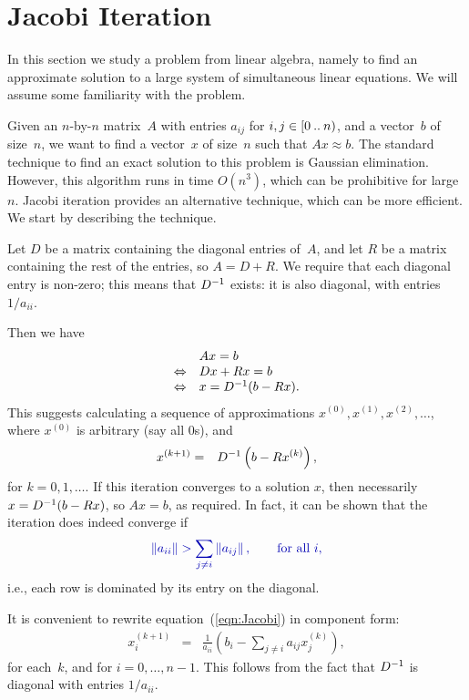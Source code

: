 \section{Jacobi Iteration}

In this section we study a problem from linear algebra, namely to find an
approximate solution to a large system of simultaneous linear equations.  We
will assume some familiarity with the problem. 

Given an $n$-by-$n$ matrix~$A$ with entries $a_{ij}$ for $i,j \in
[0 \mathbin{..} n)$, and a vector~$b$ of size~$n$, we want to find a vector~$x$
of size~$n$ such that $Ax \approx b$.
%
The standard technique to find an exact solution to this problem is Gaussian
elimination.  However, this algorithm runs in time $O(n^3)$, which can be
prohibitive for large~$n$.  Jacobi iteration provides an alternative
technique, which can be more efficient.  We start by describing the
technique.

Let $D$ be a matrix containing the diagonal entries of~$A$, and let $R$ be a
matrix containing the rest of the entries, so $A = D+R$.  We require that each
diagonal entry is non-zero; this means that $D^{-1}$ exists: it is also
diagonal, with entries $1/a_{ii}$.

Then we have
\[
\begin{array}{cl}
& Ax = b \\
\Leftrightarrow & Dx + Rx = b \\
\Leftrightarrow & x = D^{-1} (b - Rx).
\end{array}
\]
This suggests calculating a sequence of approximations $x^{(0)}, x^{(1)},
x^{(2)}, \ldots$, where $x^{(0)}$ is arbitrary (say all $0$s), and
\begin{eqnarray}
x^{(k+1)} & = & D^{-1} \left( b-R x^{(k)} \right), \label{eqn:Jacobi}
\end{eqnarray}
for $k = 0,1,\ldots$.  If this iteration converges to a solution $x$, then
necessarily $x = D^{-1} (b - Rx)$, so $Ax = b$, as required.  In fact, it
can be shown that the iteration does indeed converge if
\[\mstyle
 \left \| a_{ii} \right \| > \sum_{j \ne i} \left \| a_{ij} \right \| ,
  \qquad \mbox{for all $i$}, 
\]
i.e., each row is dominated by its entry on the diagonal. 

It is convenient to rewrite equation~(\ref{eqn:Jacobi}) in component form:
\begin{eqnarray}
x^{(k+1)}_i & = & \frac{1}{a_{ii}} \left(b_i -\sum_{j\ne i} a_{ij} x^{(k)}_j\right),
\label{eqn:Jacobi-component}
\end{eqnarray}
for each~$k$, and for $i = 0,\ldots,n-1$.  This follows from the fact that
$D^{-1}$ is diagonal with entries  $1/a_{ii}$.

